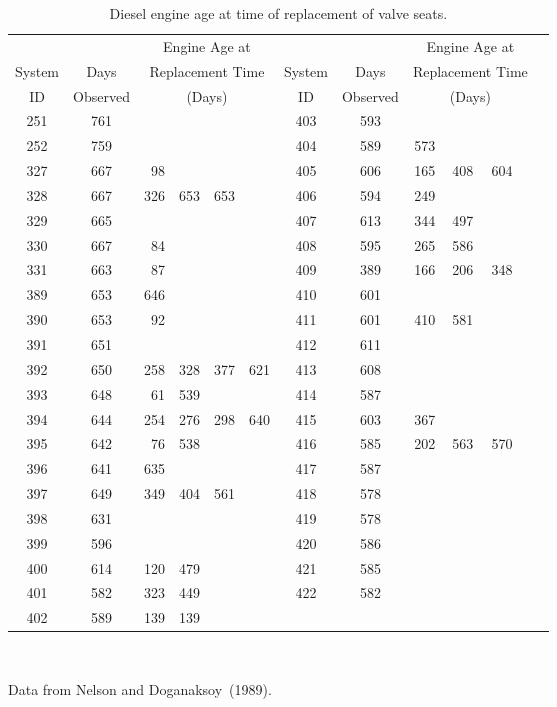\begin{table}
\caption{Diesel engine age at time of replacement of valve seats. }
\centering\small
\begin{tabular}{cc rrrr c ccc rrr}
\\[-.5ex]
\hline
& & \multicolumn{4}{c}{Engine Age at} & & & \multicolumn{4}{c}{Engine Age at}\\
\multicolumn{1}{c}{System}  & \multicolumn{1}{c}{Days} &
\multicolumn{4}{c}{Replacement Time}
& \multicolumn{1}{c}{System}  & \multicolumn{1}{c}{Days} 
& \multicolumn{4}{c}{Replacement Time} \\
\multicolumn{1}{c}{ID} & \multicolumn{1}{c}{Observed}
&\multicolumn{4}{c}{(Days)}&\multicolumn{1}{c}{ID}       
& \multicolumn{1}{c}{Observed} & \multicolumn{4}{c}{(Days)}\\
\hline
    251 &  761  && &&        &                     403  &  593 \\
    252  &  759 && && 	&		           404&589&573 \\
    327  &  667  &  98&& && 		           405&  606& 165&408&604 \\
    328  &  667  & 326  & 653 & 653 &	 &         406  &  594  & 249 \\
    329  &  665 && && 	&	           407  &  613  & 344 &  497 \\
    330  &  667  &  84 && &   &		           408  &  595 & 265 &  586 \\
    331  &  663  &  87 &&  &	 &	           409& 389&166&206&348 \\
    389  &  653  & 646 && & 	 &	           410  &  601  \\
    390  &  653  &  92 && & 	 &	           411  & 601 &410 &581 \\
    391  &  651 	&& && &		           412  &  611  \\
    392  &  650&258 &328 &377&621 &	           413  &  608  \\
    393  &  648   &  61 & 539 && 	&	   414  &  587 \\
    394  & 644 &254 &276 &298 &640  &	           415  &  603   & 367 \\
    395  &  642 &  76 & 538  && 	&	   416 &585 &202 &563 &570\\
    396  &  641  & 635 && & &			   417  &  587  \\
    397  &  649  & 349 &  404 & 561 &&	 	   418  &  578  \\
    398  &  631 && &&  &	 	    	   419  &  578  \\
    399  &  596 && && &	  		           420  &  586 \\
    400  &  614  & 120 & 479  &&	&	   421  &  585 \\
    401  &  582  & 323  & 449 && &		   422  &  582 \\
    402  &  589  & 139 &  139\\
\hline      
\end{tabular}\\
\begin{minipage}[t]{4in}
Data from
Nelson and Doganaksoy~(1989).
\end{minipage}
\label{table:valve.seat.data}
\end{table}
